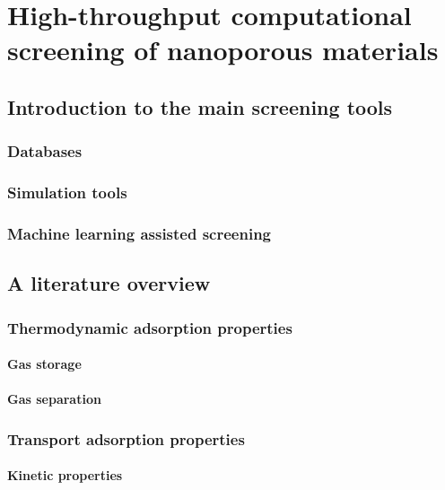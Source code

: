 \documentclass[thesis]{subfiles}
\begin{document}
\chapter{High-throughput computational screening of nanoporous materials}
\vspace*{-1\baselineskip}


\section{Introduction to the main screening tools}

\subsection{Databases}

\subsection{Simulation tools}

\subsection{Machine learning assisted screening}


\section{A literature overview}

\subsection{Thermodynamic adsorption properties}

\subsubsection{Gas storage}

\subsubsection{Gas separation}

\subsection{Transport adsorption properties}

\subsubsection{Kinetic properties}
\end{document}
